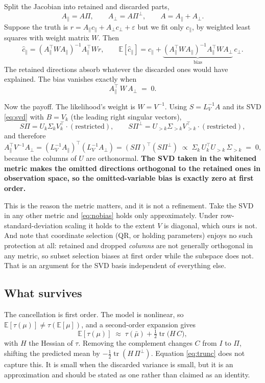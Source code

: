 \documentclass[11pt]{article}
\newcommand{\E}{\mathbb{E}}
\newcommand{\tr}{\operatorname{tr}}
\begin{document}
Split the Jacobian into retained and discarded parts,
\[
  A_{\parallel} = A\Pi, \qquad A_{\perp} = A\Pi^{\perp}, \qquad
  A = A_{\parallel} + A_{\perp}.
\]
Suppose the truth is $r = A_{\parallel}c_{\parallel} + A_{\perp}c_{\perp} + \varepsilon$
but we fit only $c_{\parallel}$, by weighted least squares with weight matrix
$W$. Then
\[
  \hat c_{\parallel}
    = (A_{\parallel}^{\top} W A_{\parallel})^{-1} A_{\parallel}^{\top} W r,
  \qquad
  \E[\hat c_{\parallel}]
    = c_{\parallel}
    + \underbrace{(A_{\parallel}^{\top} W A_{\parallel})^{-1}
       A_{\parallel}^{\top} W A_{\perp}}_{\text{bias}}\, c_{\perp}.
\]
The retained directions absorb whatever the discarded ones would have explained.
The bias vanishes exactly when
\begin{equation}
  A_{\parallel}^{\top}\,W\,A_{\perp} \;=\; 0 .
  \label{eq:nobias}
\end{equation}

Now the payoff. The likelihood's weight is $W = V^{-1}$. Using $S = L_V^{-1}A$
and its SVD \eqref{eq:svd} with $B = V_k$ (the leading right singular vectors),
\[
  S\Pi = U_k \Sigma_k V_k^{\top}\!\cdot\!(\text{restricted}),
  \qquad
  S\Pi^{\perp} = U_{>k}\Sigma_{>k}V_{>k}^{\top}\!\cdot\!(\text{restricted}),
\]
and therefore
\[
  A_{\parallel}^{\top} V^{-1} A_{\perp}
    = (L_V^{-1}A_{\parallel})^{\top}(L_V^{-1}A_{\perp})
    = (S\Pi)^{\top}(S\Pi^{\perp})
    \;\propto\; \Sigma_k\, U_k^{\top} U_{>k}\, \Sigma_{>k}
    \;=\; 0,
\]
because the columns of $U$ are orthonormal. \textbf{The SVD taken in the
whitened metric makes the omitted directions orthogonal to the retained ones in
observation space, so the omitted-variable bias is exactly zero at first order.}

This is the reason the metric matters, and it is not a refinement. Take the SVD
in any other metric and \eqref{eq:nobias} holds only approximately. Under
row-standard-deviation scaling it holds to the extent $V$ is diagonal, which
ours is not. And note that coordinate selection (QR, or holding parameters)
enjoys no such protection at all: retained and dropped \emph{columns} are not
generally orthogonal in any metric, so subset selection biases at first order
while the subspace does not. That is an argument for the SVD basis independent
of everything else.

\subsection{What survives}

The cancellation is first order. The model is nonlinear, so
$\E[\tau(\mu)] \ne \tau(\E[\mu])$, and a second-order expansion gives
\[
  \E[\tau(\mu)] \;\approx\; \tau(\bar\mu) + \tfrac12 \tr\!\big(H\,C\big),
\]
with $H$ the Hessian of $\tau$. Removing the complement changes $C$ from $I$ to
$\Pi$, shifting the predicted mean by $-\tfrac12\tr(H\,\Pi^{\perp})$. Equation
\eqref{eq:trunc} does not capture this. It is small when the discarded variance
is small, but it is an approximation and should be stated as one rather than
claimed as an identity.
\end{document}
